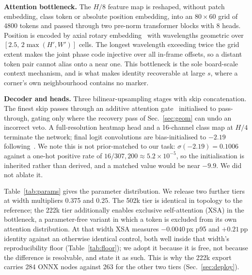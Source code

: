 \documentclass[10pt,twocolumn,letterpaper]{article}
\begin{document}
\textbf{Attention bottleneck.} The $H/8$ feature map is reshaped, without patch embedding, class
token or absolute position embedding, into an $80\times60$ grid of 4800 tokens and passed through
two pre-norm transformer blocks with 8 heads. Position is encoded by axial rotary
embedding~\cite{roformer,ropevit} with wavelengths geometric over $[2.5,\,2\max(H',W')]$ cells. The
longest wavelength exceeding twice the grid extent makes the joint phase code injective over all
in-frame offsets, so a distant token pair cannot alias onto a near one. This bottleneck is the sole
board-scale context mechanism, and is what makes identity recoverable at large $s$, where a
corner's own neighbourhood contains no marker.

\textbf{Decoder and heads.} Three bilinear-upsampling stages with skip concatenation. The finest
skip passes through an additive attention gate~\cite{attnunet} initialised to pass-through, gating
only where the recovery pass of Sec.~\ref{sec:geom} can undo an incorrect veto. A full-resolution
heatmap head and a 16-channel class map at $H/4$ terminate the network; final logit convolutions
are bias-initialised to $-2.19$ following~\cite{cornernet,centernet}. We note this is not
prior-matched to our task: $\sigma(-2.19) = 0.1006$ against a one-hot positive rate of
$16/307{,}200 \approx 5.2\times10^{-5}$, so the initialisation is inherited rather than derived,
and a matched value would be near $-9.9$. We did not ablate it.

Table~\ref{tab:params} gives the parameter distribution. We release two further tiers at width
multipliers 0.375 and 0.25. The 502k tier is identical in topology to the reference; the 222k tier
additionally enables exclusive self-attention (XSA) in the bottleneck, a parameter-free variant in
which a token is excluded from its own attention distribution. At that width XSA measures
$-0.0040$\,px p95 and $+0.21$\,pp identity against an otherwise identical control, both well
inside that width's reproducibility floor (Table~\ref{tab:floor}); we adopt it because it is free,
not because the difference is resolvable, and state it as such. This is why the 222k export carries
284 ONNX nodes against 263 for the other two tiers (Sec.~\ref{sec:deploy}).
\end{document}
